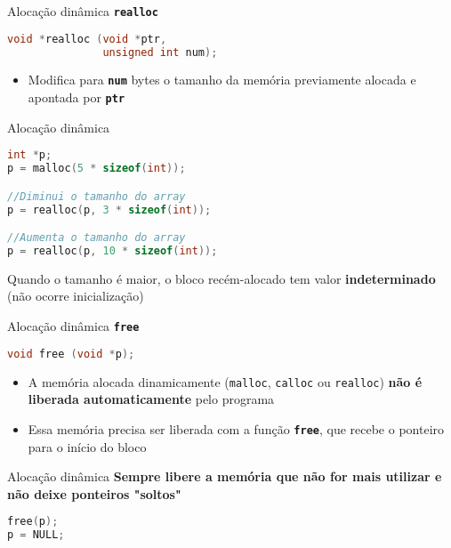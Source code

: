 \documentclass[10pt]{beamer}
\begin{document}
\begin{frame}[fragile]{Alocação dinâmica}
  \huge
  \textbf{\texttt{realloc}}
  \vfill
  \Large
  \begin{lstlisting}[language=C]
void *realloc (void *ptr,
               unsigned int num);
  \end{lstlisting}
  \vfill
  \large
  \setlength{\leftmargini}{0pt}
  \begin{itemize}
      \item [] Modifica para \textbf{\texttt{num}} bytes o tamanho da memória previamente alocada e apontada por \textbf{\texttt{ptr}}
  \end{itemize}
\end{frame}

\begin{frame}[fragile]{Alocação dinâmica}
  \large
  \vfill
  \begin{lstlisting}[language=C]
int *p;
p = malloc(5 * sizeof(int));

//Diminui o tamanho do array
p = realloc(p, 3 * sizeof(int));

//Aumenta o tamanho do array
p = realloc(p, 10 * sizeof(int));
  \end{lstlisting}
  \vfill
  Quando o tamanho é maior, o bloco recém-alocado tem valor \textbf{indeterminado} (não ocorre inicialização)
\end{frame}

\begin{frame}[fragile]{Alocação dinâmica}
  \huge
  \textbf{\texttt{free}}
  \vfill
  \Large
  \begin{lstlisting}[language=C]
void free (void *p);
  \end{lstlisting}
  \vfill
  \large
  \setlength{\leftmargini}{0pt}
  \begin{itemize}
      \item [] A memória alocada dinamicamente (\texttt{malloc}, \texttt{calloc} ou \texttt{realloc}) \textbf{não é liberada automaticamente} pelo programa \faExclamationTriangle
      \item [] Essa memória precisa ser liberada com a função \textbf{\texttt{free}}, que recebe o ponteiro para o início do bloco
  \end{itemize}
\end{frame}

\begin{frame}[fragile]{Alocação dinâmica}
  \huge
  \textbf{\alert{Sempre} libere a memória que não for mais utilizar e não deixe ponteiros "soltos"}
  \vfill
  \begin{lstlisting}[language=C]
free(p);
p = NULL;
  \end{lstlisting}
\end{frame}
\end{document}
